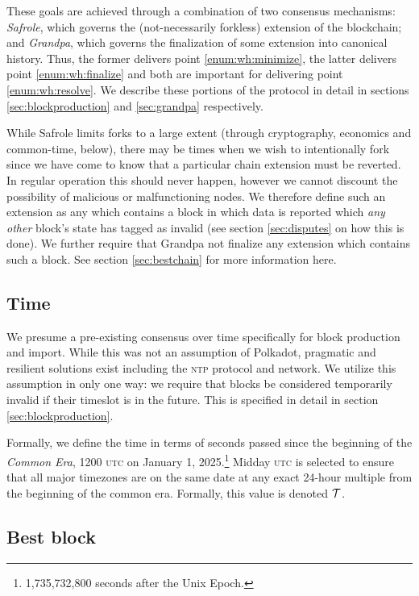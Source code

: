 These goals are achieved through a combination of two consensus mechanisms: \emph{Safrole}, which governs the (not-necessarily forkless) extension of the blockchain; and \emph{Grandpa}, which governs the finalization of some extension into canonical history. Thus, the former delivers point \ref{enum:wh:minimize}, the latter delivers point \ref{enum:wh:finalize} and both are important for delivering point \ref{enum:wh:resolve}. We describe these portions of the protocol in detail in sections \ref{sec:blockproduction} and \ref{sec:grandpa} respectively.

While Safrole limits forks to a large extent (through cryptography, economics and common-time, below), there may be times when we wish to intentionally fork since we have come to know that a particular chain extension must be reverted. In regular operation this should never happen, however we cannot discount the possibility of malicious or malfunctioning nodes. We therefore define such an extension as any which contains a block in which data is reported which \emph{any other} block's state has tagged as invalid (see section \ref{sec:disputes} on how this is done). We further require that Grandpa not finalize any extension which contains such a block. See section \ref{sec:bestchain} for more information here.

\subsection{Time}\label{sec:commonera}

We presume a pre-existing consensus over time specifically for block production and import. While this was not an assumption of Polkadot, pragmatic and resilient solutions exist including the \textsc{ntp} protocol and network. We utilize this assumption in only one way: we require that blocks be considered temporarily invalid if their timeslot is in the future. This is specified in detail in section \ref{sec:blockproduction}.

Formally, we define the time in terms of seconds passed since the beginning of the \Jam\emph{Common Era}, 1200 \textsc{utc} on January 1, 2025.\footnote{1,735,732,800 seconds after the Unix Epoch.} Midday \textsc{utc} is selected to ensure that all major timezones are on the same date at any exact 24-hour multiple from the beginning of the common era. Formally, this value is denoted $\mathcal{T}$.

\subsection{Best block}

